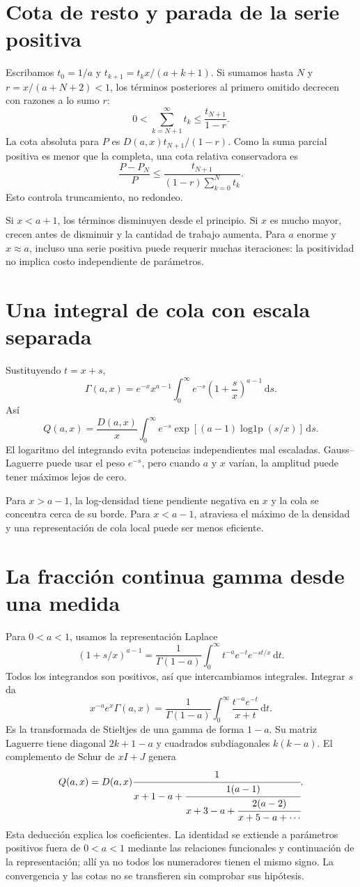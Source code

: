 \documentclass[11pt,a4paper]{article}
\newcommand{\dd}{\,\mathrm d}
\theoremstyle{definition}
\DeclareMathOperator{\logonep}{log1p}
\begin{document}
\section{Cota de resto y parada de la serie positiva}
Escribamos $t_0=1/a$ y $t_{k+1}=t_kx/(a+k+1)$. Si sumamos hasta $N$ y $r=x/(a+N+2)<1$, los términos posteriores al primero omitido decrecen con razones a lo sumo $r$:
\[
0<\sum_{k=N+1}^\infty t_k\le\frac{t_{N+1}}{1-r}.
\]
La cota absoluta para $P$ es $D(a,x)t_{N+1}/(1-r)$. Como la suma parcial positiva es menor que la completa, una cota relativa conservadora es
\[
\frac{P-P_N}{P}\le
\frac{t_{N+1}}{(1-r)\sum_{k=0}^Nt_k}.
\]
Esto controla truncamiento, no redondeo.

Si $x<a+1$, los términos disminuyen desde el principio. Si $x$ es mucho mayor, crecen antes de disminuir y la cantidad de trabajo aumenta. Para $a$ enorme y $x\approx a$, incluso una serie positiva puede requerir muchas iteraciones: la positividad no implica costo independiente de parámetros.

\section{Una integral de cola con escala separada}
Sustituyendo $t=x+s$,
\[
\Gamma(a,x)=e^{-x}x^{a-1}
\int_0^\infty e^{-s}\left(1+\frac sx\right)^{a-1}\dd s.
\]
Así
\[
Q(a,x)=\frac{D(a,x)}x
\int_0^\infty e^{-s}
\exp[(a-1)\logonep(s/x)]\dd s.
\]
El logaritmo del integrando evita potencias independientes mal escaladas. Gauss--Laguerre puede usar el peso $e^{-s}$, pero cuando $a$ y $x$ varían, la amplitud puede tener máximos lejos de cero.

Para $x>a-1$, la log-densidad tiene pendiente negativa en $x$ y la cola se concentra cerca de su borde. Para $x<a-1$, atraviesa el máximo de la densidad y una representación de cola local puede ser menos eficiente.

\section{La fracción continua gamma desde una medida}
Para $0<a<1$, usamos la representación Laplace
\[
(1+s/x)^{a-1}
=\frac1{\Gamma(1-a)}\int_0^\infty
t^{-a}e^{-t}e^{-st/x}\dd t.
\]
Todos los integrandos son positivos, así que intercambiamos integrales. Integrar $s$ da
\[
x^{-a}e^x\Gamma(a,x)
=\frac1{\Gamma(1-a)}\int_0^\infty
\frac{t^{-a}e^{-t}}{x+t}\dd t.
\]
Es la transformada de Stieltjes de una gamma de forma $1-a$. Su matriz Laguerre tiene diagonal $2k+1-a$ y cuadrados subdiagonales $k(k-a)$. El complemento de Schur de $xI+J$ genera
\[
Q(a,x)=D(a,x)
\cfrac1{x+1-a+\cfrac{1(a-1)}{x+3-a+
\cfrac{2(a-2)}{x+5-a+\cdots}}}.
\]
Esta deducción explica los coeficientes. La identidad se extiende a parámetros positivos fuera de $0<a<1$ mediante las relaciones funcionales y continuación de la representación; allí ya no todos los numeradores tienen el mismo signo. La convergencia y las cotas no se transfieren sin comprobar sus hipótesis.
\end{document}
